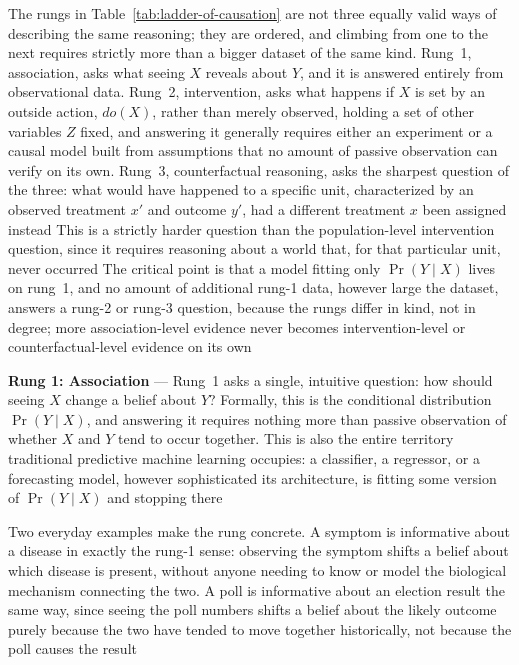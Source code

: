 The rungs in Table~\ref{tab:ladder-of-causation} are not three equally valid ways
of describing the same reasoning; they are ordered, and climbing from one to the
next requires strictly more than a bigger dataset of the same kind. Rung~1, association,
asks what seeing $X$ reveals about $Y$, and it is answered entirely from observational
data. Rung~2, intervention, asks what happens if $X$ is set by an outside action,
$do(X)$, rather than merely observed, holding a set of other variables $Z$ fixed,
and answering it generally requires either an experiment or a causal model built
from assumptions that no amount of passive observation can verify on its own. Rung~3,
counterfactual reasoning, asks the sharpest question of the three: what would
have happened to a specific unit, characterized by an observed treatment $x'$ and
outcome $y'$, had a different treatment $x$ been assigned instead This is a
strictly harder question than the population-level intervention question, since it
requires reasoning about a world that, for that particular unit, never occurred
The critical point is that a model fitting only $\Pr(Y \mid X)$ lives on rung~1,
and no amount of additional rung-1 data, however large the dataset, answers a rung-2
or rung-3 question, because the rungs differ in kind, not in degree; more
association-level evidence never becomes intervention-level or counterfactual-level
evidence on its own

\textbf{Rung 1: Association} --- Rung~1 asks a single, intuitive question: how
should seeing $X$ change a belief about $Y$? Formally, this is the conditional
distribution $\Pr(Y \mid X)$, and answering it requires nothing more than passive
observation of whether $X$ and $Y$ tend to occur together. This is also the
entire territory traditional predictive machine learning occupies: a classifier,
a regressor, or a forecasting model, however sophisticated its architecture, is fitting
some version of $\Pr(Y \mid X)$ and stopping there

Two everyday examples make the rung concrete. A symptom is informative about a disease
in exactly the rung-1 sense: observing the symptom shifts a belief about which
disease is present, without anyone needing to know or model the biological mechanism
connecting the two. A poll is informative about an election result the same way,
since seeing the poll numbers shifts a belief about the likely outcome purely because
the two have tended to move together historically, not because the poll causes
the result

